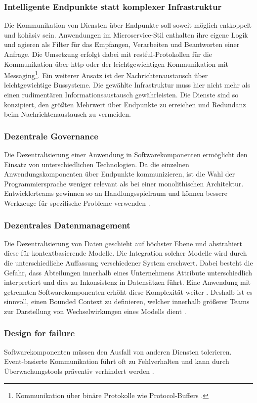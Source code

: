 \subsubsection{Intelligente Endpunkte statt komplexer Infrastruktur}
Die Kommunikation von Diensten über Endpunkte soll soweit möglich entkoppelt und kohäsiv sein.  
Anwendungen im Microservice-Stil enthalten ihre eigene Logik und agieren als Filter für das Empfangen, Verarbeiten und Beantworten einer Anfrage. 
Die Umsetzung erfolgt dabei mit \acs{rest}ful-Protokollen für die Kommunikation über \acs{http} oder der leichtgewichtigen Kommunikation mit Messaging\footnote{Kommunikation über binäre Protokolle wie Protocol-Buffers \cite{ProtoBuf}.}.
Ein weiterer Ansatz ist der Nachrichtenaustausch über leichtgewichtige Bussysteme.
Die gewählte Infrastruktur muss hier nicht mehr als einen rudimentären Informationsaustausch gewährleisten. 
Die Dienste sind so konzipiert, den größten Mehrwert über Endpunkte zu erreichen und Redundanz beim Nachrichtenaustausch zu vermeiden.

\subsubsection{Dezentrale Governance}
Die Dezentralisierung einer Anwendung in Softwarekomponenten ermöglicht den Einsatz von unterschiedlichen Technologien. 
Da die einzelnen Anwendungskomponenten über Endpunkte kommunizieren, ist die Wahl der Programmiersprache weniger relevant als bei einer monolithischen Architektur. 
Entwicklerteams gewinnen so an Handlungsspielraum und können bessere Werkzeuge für spezifische Probleme verwenden \cite{FowlerMicroservice}.

\subsubsection{Dezentrales Datenmanagement}
Die Dezentralisierung von Daten geschieht auf höchster Ebene und abstrahiert diese für kontextbasierende Modelle. 
Die Integration solcher Modelle wird durch die unterschiedliche Auffassung verschiedener System erschwert. 
Dabei besteht die Gefahr, dass Abteilungen innerhalb eines Unternehmens Attribute unterschiedlich interpretiert und dies zu Inkonsistenz in Datensätzen führt.
Eine Anwendung mit getrennten Softwarekomponenten erhöht diese Komplexität weiter \cite{FowlerMicroservice}. 
Deshalb ist es sinnvoll, einen \glqq Bounded Context\grqq{} zu definieren, welcher innerhalb größerer Teams zur Darstellung von Wechselwirkungen eines Modells dient \cite{FowlerBoundedContext}. 

\subsubsection{Design for failure}
Softwarekomponenten müssen den Ausfall von anderen Diensten tolerieren. 
Event-basierte Kommunikation führt oft zu Fehlverhalten und kann durch Überwachungstools präventiv verhindert werden \cite{FowlerMicroservice}. 
